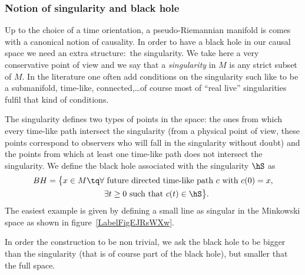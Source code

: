 \subsubsection{Notion of singularity and black hole}

Up to the choice of a time orientation, a pseudo-Riemannian manifold is comes with a canonical notion of causality. In order to have a black hole in our causal space we need an extra structure:~the singularity. We take here a very conservative point of view and we say that a \emph{singularity} in $M$ is any strict subset of $M$. In the literature one often add conditions on the singularity such like to be a submanifold, time-like, connected,\ldots of course most of ``real live'' singularities fulfil that kind of conditions.

The singularity defines two types of points in the space: the ones from which every time-like path intersect the singularity (from a physical point of view, these points correspond to observers who will fall in the singularity without doubt) and the points from which at least one time-like path does not intersect the singularity. We define the black hole associated with the singularity $\hS$ as
\begin{align}
  BH=\big\{ x\in M\tq \forall &\text{ future directed time-like path } c \text{ with } c(0)=x,\\
			&\exists t\geq0  \text{ such that } c(t)\in \hS \big\}.
\end{align}
The easiest example is given by defining a small line as singular in the Minkowski space as shown in figure~\ref{LabelFigEJRsWXw}.
\newcommand{\CaptionFigEJRsWXw}{The red line is the singularity and the green zone is the black hole associated with.}


In order the construction to be non trivial, we ask the black hole to be bigger than the singularity (that is of course part of the black hole), but smaller that the full space.


